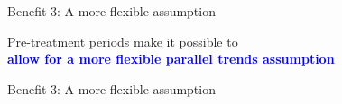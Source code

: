 \documentclass{beamer}
\newcommand\bblue[1]{\textcolor{blue}{\textbf{#1}}}
\begin{document}
\begin{frame}{Benefit 3: A more flexible assumption}

Pre-treatment periods make it possible to\\
\bblue{allow for a more flexible parallel trends assumption}

\end{frame}

\begin{frame}{Benefit 3: A more flexible assumption}
\end{frame}
\end{document}
